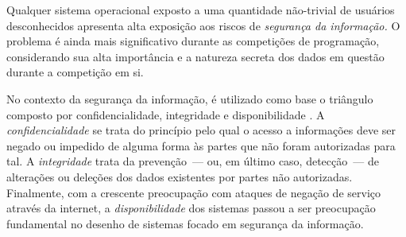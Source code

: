 \documentclass[ruledheader, 12pt]{abnt}
\begin{document}
Qualquer sistema operacional exposto a uma quantidade não-trivial de usuários desconhecidos apresenta alta exposição aos riscos de \emph{segurança da informação.} O problema é ainda mais significativo durante as competições de programação, considerando sua alta importância e a natureza secreta dos dados em questão durante a competição em si.

No contexto da segurança da informação, é utilizado como base o triângulo composto por confidencialidade, integridade e disponibilidade \cite{stamp2011}. A \emph{confidencialidade} se trata do princípio pelo qual o acesso a informações deve ser negado ou impedido de alguma forma às partes que não foram autorizadas para tal. A \emph{integridade} trata da prevenção~--- ou, em último caso, detecção~--- de alterações ou deleções dos dados existentes por partes não autorizadas. Finalmente, com a crescente preocupação com ataques de negação de serviço através da internet, a \emph{disponibilidade} dos sistemas passou a ser preocupação fundamental no desenho de sistemas focado em segurança da informação.
\end{document}

